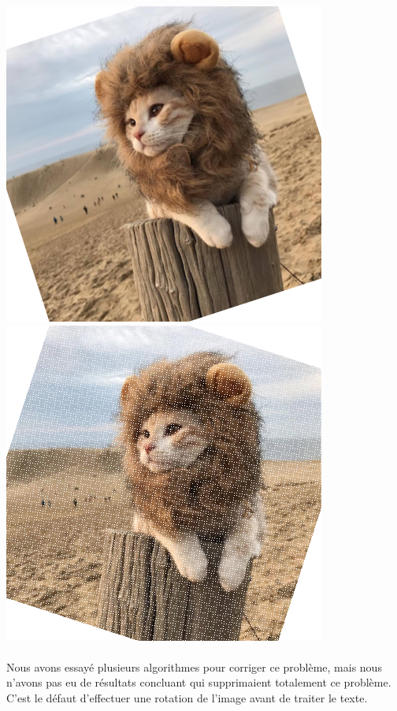 \documentclass{article}
\begin{document}
\begin{center}
    \includegraphics[scale=0.6]{exampleRotateSimbaForFisch.bmp}
    \vspace*{1cm}
    \includegraphics[scale=0.6]{rotationPixelsManquants.bmp}
\end{center}

\paragraph{}
Nous avons essayé plusieurs algorithmes pour corriger ce problème, mais nous n'avons pas eu de résultats concluant qui supprimaient totalement ce problème. C'est le défaut d'effectuer une rotation de l'image avant de traiter le texte.
\end{document}
